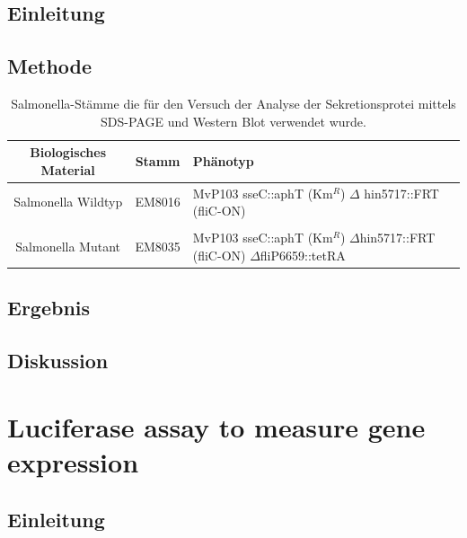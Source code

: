 \documentclass[oneside,10pt,a4paper]{report}
\begin{document}
		\subsection{Einleitung}
		
		\subsection{Methode}
			\begin{table}[H]
				\centering
				\caption{Salmonella-Stämme die für den Versuch der Analyse der Sekretionsprotei mittels SDS-PAGE und Western Blot verwendet wurde.}
				\label{tab: exp6-biologisches Material part1}
				\begin{tabular}{ccp{7.5cm}}
					\toprule
					Biologisches Material& Stamm & Phänotyp\\
					\midrule
					\multirow{2}{*}{\parbox[t]{2cm}{Salmonella Wildtyp}}  & \multirow{2}{*}{EM8016} & \multirow{2}{*}{\parbox[t]{7.5cm}{MvP103 sseC::aphT (Km$^R$) $\Delta$ hin5717::FRT (fliC-ON)}}\\
					&&\\
					&&\\
					\multirow{3}{*}{\parbox[t]{2cm}{Salmonella Mutant}} & \multirow{3}{*}{EM8035} &\multirow{3}{*}{\parbox[t]{7.5cm}{MvP103 sseC::aphT (Km$^R$) $\Delta$hin5717::FRT (fliC-ON) $\Delta$fliP6659::tetRA}} \\
					&&\\
					&&\\
					
					\bottomrule			
				\end{tabular}
			\end{table}
			
			\subsection{Ergebnis}
			
			\subsection{Diskussion}
			
		\section{Luciferase assay to measure gene expression}
		
			\subsection{Einleitung}
			
\end{document}

